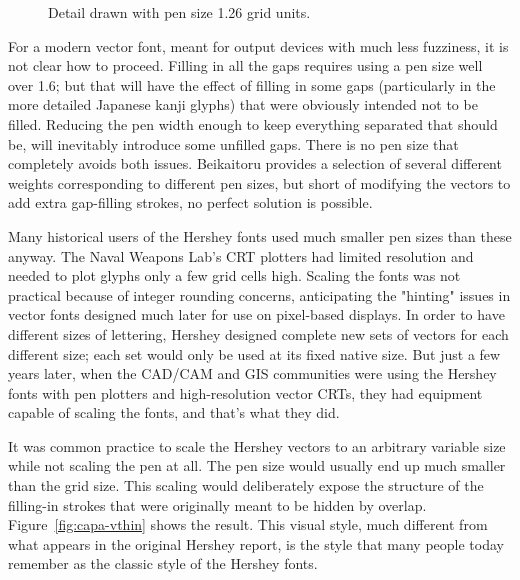 \documentclass{article}
\newcommand{\SegRad}{0.79}
\newcommand{\FatSegment}[2]{%
($(#1)!\SegRad cm!90:(#2)$) %
  ..controls ($(#1)!1.12*\SegRad cm!120:(#2)$) %
         and ($(#1)!1.12*\SegRad cm!150:(#2)$).. %
($(#1)!-\SegRad cm!0:(#2)$) %
  ..controls ($(#1)!1.12*\SegRad cm!-150:(#2)$) %
         and ($(#1)!1.12*\SegRad cm!-120:(#2)$).. %
($(#1)!\SegRad cm!-90:(#2)$) -- %
($(#2)!\SegRad cm!90:(#1)$) %
  ..controls ($(#2)!1.12*\SegRad cm!120:(#1)$) %
         and ($(#2)!1.12*\SegRad cm!150:(#1)$).. %
($(#2)!-\SegRad cm!0:(#1)$) %
  ..controls ($(#2)!1.12*\SegRad cm!-150:(#1)$) %
         and ($(#2)!1.12*\SegRad cm!-120:(#1)$).. %
($(#2)!\SegRad cm!-90:(#1)$) -- %
cycle %
}
\begin{document}
\begin{figure}
  \centering\renewcommand{\SegRad}{0.63}
  \caption{Detail drawn with pen size 1.26 grid units.}
  \label{fig:capa-thin}
\end{figure}

For a modern vector font, meant for output devices with much less fuzziness,
it is not clear how to proceed.  Filling in all the gaps requires using a
pen size well over 1.6; but that will have the effect of filling in some
gaps (particularly in the more detailed Japanese kanji glyphs) that were
obviously intended not to be filled.  Reducing the pen width enough to keep
everything separated that should be, will inevitably introduce some unfilled
gaps.  There is no pen size that completely avoids both issues.  Beikaitoru
provides a selection of several different weights corresponding to different
pen sizes, but short of modifying the vectors to add extra gap-filling
strokes, no perfect solution is possible.

Many historical users of the Hershey fonts used much smaller pen sizes than
these anyway.  The Naval Weapons Lab's CRT plotters had limited resolution
and needed to plot glyphs only a few grid cells high.  Scaling the fonts was
not practical because of integer rounding concerns, anticipating the
"hinting" issues in vector fonts designed much later for use on pixel-based
displays.  In order to have different sizes of lettering, Hershey designed
complete new sets of vectors for each different size; each set would only be
used at its fixed native size.  But just a few years later, when the CAD/CAM
and GIS communities were using the Hershey fonts with pen plotters and
high-resolution vector CRTs, they had equipment capable of scaling the
fonts, and that's what they did.

It was common practice to scale the Hershey vectors to an arbitrary variable
size while not scaling the pen at all.  The pen size would usually end up
much smaller than the grid size.  This scaling would deliberately expose the
structure of the filling-in strokes that were originally meant to be hidden
by overlap.  Figure~\ref{fig:capa-vthin} shows the result.  This visual
style, much different from what appears in the original Hershey report, is
the style that many people today remember as the classic style of the
Hershey fonts.
\end{document}
